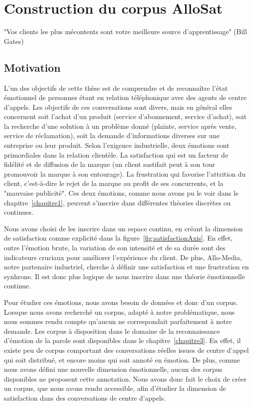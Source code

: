 \chapter{Construction du corpus AlloSat}
\label{chapitre4}
"Vos clients les plus mécontents sont votre meilleure source d’apprentissage" (Bill Gates)

\section{Motivation}
\begin{minipage}{.65\textwidth}
L'un des objectifs de cette thèse est de comprendre et de reconnaître l'état émotionnel de personnes étant en relation téléphonique avec des agents de centre d'appels. Les objectifs de ces conversations sont divers, mais en général elles concernent soit l'achat d'un produit (service d'abonnement, service d'achat), soit la recherche d'une solution à un problème donné (plainte, service après vente, service de réclamation), soit la demande d'informations diverses sur une entreprise ou leur produit. Selon l'exigence industrielle, deux émotions sont primordiales dans la relation clientèle. La satisfaction qui est un facteur de fidélité et de diffusion de la marque (un client sastifait peut à son tour promouvoir la marque à son entourage). La frustration qui favorise l'attrition du client, c'est-à-dire le rejet de la marque au profit de ses concurrents, et la "mauvaise publicité". Ces deux émotions, comme nous avons pu le voir dans le chapitre~\ref{chapitre1}, peuvent s'inscrire dans différentes théories discrètes ou continues.

Nous avons choisi de les inscrire dans un espace continu, en créant la dimension de satisfaction comme explicité dans la figure~\ref{fig:satisfactionAxis}. En effet, outre l'émotion brute, la variation de son intensité et de sa durée sont des indicateurs cruciaux pour améliorer l'expérience du client. De plus, Allo-Media, notre partenaire industriel, cherche à définir une satisfaction et une frustration en synhrone. Il est donc plus logique de nous inscrire dans une théorie émotionnelle continue.
\end{minipage}


\newpage
Pour étudier ces émotions, nous avons besoin de données et donc d'un corpus.
Lorsque nous avons recherché un corpus, adapté à notre problématique, nous nous sommes rendu compte qu'aucun ne correspondait parfaitement à notre demande. Les corpus à disposition dans le domaine de la reconnaissance d'émotion de la parole sont disponibles dans le chapitre~\ref{chapitre3}.
En effet, il existe peu de corpus comportant des conversations réelles issues de centre d'appel qui soit distribué, et encore moins qui soit annoté en émotion. De plus, comme nous avons défini une nouvelle dimension émotionnelle, aucun des corpus disponibles ne proposent cette annotation. Nous avons donc fait le choix de créer un corpus, que nous avons rendu accessible, afin d'étudier la dimension de satisfaction dans des conversations de centre d'appels.



